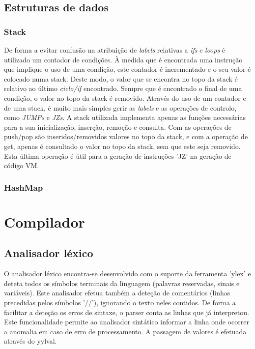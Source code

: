 \documentclass[a4paper,10pt]{report}
\begin{document}
\section{Estruturas de dados}

\subsection{Stack}
      De forma a evitar confusão na atribuição de \emph{labels} relativas a \emph{ifs} e \emph{loops} é utilizado um contador de condições. À medida que é encontrada uma instrução que implique o uso de uma condição, este contador é incrementado e o seu valor é colocado numa stack. Deste modo, o valor que se encontra no topo da stack é relativo ao último \emph{ciclo/if} encontrado. Sempre que é encontrado o final de uma condição, o valor no topo da stack é removido. Através do uso de um contador e de uma stack, é muito mais simples gerir as \emph{labels} e as operações de controlo, como \emph{JUMPs} e \emph{JZs}.
      A stack utilizada implementa apenas as funções necessárias para a sua inicialização, inserção, remoção e consulta. Com as operações de push/pop são inseridos/removidos valores no topo da stack, e com a operação de get, apenas é consultado o valor no topo da stack, sem que este seja removido. Esta última operação é útil para a geração de instruções 'JZ' na geração de código VM.

\subsection{HashMap}
	


\chapter{Compilador}


\section{Analisador léxico}
  O analisador léxico encontra-se desenvolvido com o suporte da ferramenta 'ylex' e deteta todos os símbolos terminais da linguagem (palavras reservadas, sinais e variáveis). Este analisador efetua também a deteção de comentários (linhas precedidas pelos símbolos '//'), ignorando o texto neles contidos. De forma a facilitar a deteção os erros de sintaxe, o parser conta as linhas que já interpretou. Este funcionalidade permite ao analisador sintático informar a linha onde ocorrer a anomalia em caso de erro de processamento. A passagem de valores é efetuada através do yylval.  
\end{document}

